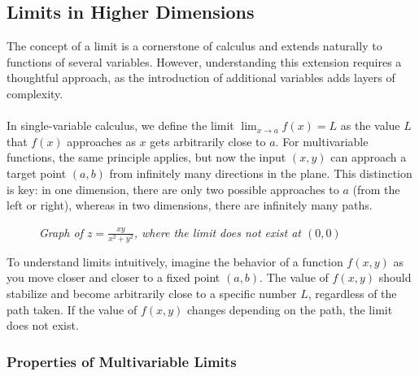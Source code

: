 \subsection*{Limits in Higher Dimensions}

\noindent The concept of a limit is a cornerstone of calculus and extends naturally to functions of several variables. However, understanding this extension requires a thoughtful approach, as the introduction of additional variables adds layers of complexity. \\ \\ In single-variable calculus, we define the limit \( \lim_{x \to a} f(x) = L \) as the value \( L \) that \( f(x) \) approaches as \( x \) gets arbitrarily close to \( a \). For multivariable functions, the same principle applies, but now the input \( (x, y) \) can approach a target point \( (a, b) \) from infinitely many directions in the plane. This distinction is key: in one dimension, there are only two possible approaches to \( a \) (from the left or right), whereas in two dimensions, there are infinitely many paths. 

\begin{figure}[H]
    \centering
{}
    \caption{\textit{Graph of \(z = \frac{x y}{x^2 + y^2} \), where the limit does not exist at $(0,0)$}}
    \label{fig:surface_xy_over_x2y2}
\end{figure}


\noindent To understand limits intuitively, imagine the behavior of a function \( f(x, y) \) as you move closer and closer to a fixed point \( (a, b) \). The value of \( f(x, y) \) should stabilize and become arbitrarily close to a specific number \( L \), regardless of the path taken. If the value of \( f(x, y) \) changes depending on the path, the limit does not exist.

\subsubsection*{Properties of Multivariable Limits} 

